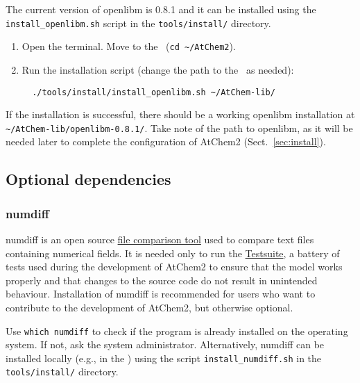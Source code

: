 The current version of openlibm is 0.8.1 and it can be installed using
the \texttt{install\_openlibm.sh} script in the \texttt{tools/install/}
directory.

\begin{enumerate}
\item Open the terminal. Move to the \maindir\ (\verb|cd ~/AtChem2|).
\item Run the installation script (change the path to the \depdir\ as
  needed):
  \begin{verbatim}
  ./tools/install/install_openlibm.sh ~/AtChem-lib/
  \end{verbatim}
\end{enumerate}

If the installation is successful, there should be a working openlibm
installation at \texttt{\textasciitilde/AtChem-lib/openlibm-0.8.1/}.
Take note of the path to openlibm, as it will be needed later to
complete the configuration of AtChem2 (Sect.~\ref{sec:install}).

\subsection{Optional dependencies} \label{subsec:optional-dependencies}

\subsubsection{numdiff}

numdiff is an open source \href{https://www.nongnu.org/numdiff}{file comparison tool}
used to compare text files containing numerical fields. It is needed only
to run the \hyperref[sec:test-suite]{Testsuite}, a battery of tests
used during the development of AtChem2 to ensure that the model works
properly and that changes to the source code do not result in
unintended behaviour. Installation of numdiff is recommended for users
who want to contribute to the development of AtChem2, but otherwise
optional.

Use \verb|which numdiff| to check if the program is already installed
on the operating system. If not, ask the system administrator.
Alternatively, numdiff can be installed locally (e.g., in the \depdir)
using the script \texttt{install\_numdiff.sh} in the
\texttt{tools/install/} directory.

